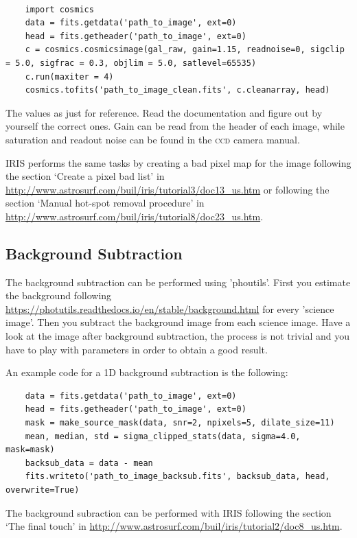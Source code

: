 \documentclass[a4paper, 11pt, fleqn]{memoir}
\begin{document}
\paragraph{}
\begin{verbatim}
    import cosmics
    data = fits.getdata('path_to_image', ext=0)
    head = fits.getheader('path_to_image', ext=0)
    c = cosmics.cosmicsimage(gal_raw, gain=1.15, readnoise=0, sigclip = 5.0, sigfrac = 0.3, objlim = 5.0, satlevel=65535)
    c.run(maxiter = 4)
    cosmics.tofits('path_to_image_clean.fits', c.cleanarray, head)
\end{verbatim}
The values as just for reference.
Read the documentation and figure out by yourself the correct ones.
Gain can be read from the header of each image, while saturation and readout noise can be found in the \textsc{ccd} camera manual.

IRIS performs the same tasks by creating a bad pixel map for the image following the section `Create a pixel bad list' in \url{http://www.astrosurf.com/buil/iris/tutorial3/doc13_us.htm} or following the section `Manual hot-spot removal procedure' in \url{http://www.astrosurf.com/buil/iris/tutorial8/doc23_us.htm}.

\subsection{Background Subtraction}

The background subtraction can be performed using 'phoutils'.
First you estimate the background following \url{https://photutils.readthedocs.io/en/stable/background.html} for every 'science image'.
Then you subtract the background image from each science image.
Have a look at the image after background subtraction, the process is not trivial and you have to play with parameters in order to obtain a good result.

An example code for a 1D background subtraction is the following:
\begin{verbatim}
    data = fits.getdata('path_to_image', ext=0)
    head = fits.getheader('path_to_image', ext=0)
    mask = make_source_mask(data, snr=2, npixels=5, dilate_size=11)
    mean, median, std = sigma_clipped_stats(data, sigma=4.0, mask=mask)
    backsub_data = data - mean
    fits.writeto('path_to_image_backsub.fits', backsub_data, head, overwrite=True)
\end{verbatim}

The background subraction can be performed with IRIS following the section `The final touch' in \url{http://www.astrosurf.com/buil/iris/tutorial2/doc8_us.htm}.
\end{document}
